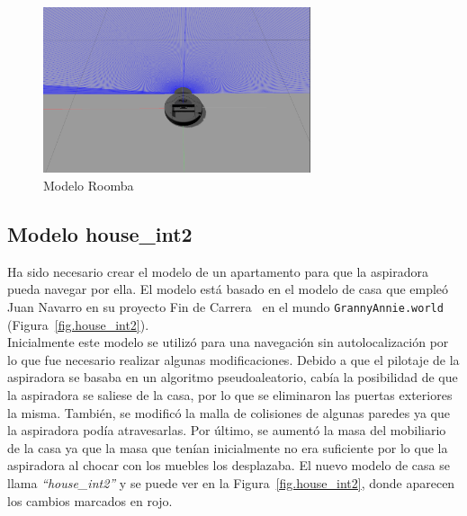 \begin{figure}[H]
  \begin{center}
    \includegraphics[width=0.7\textwidth]{figures/Vacuum/vacuumModel.png}
		\caption{Modelo Roomba}
		\label{fig.vacuumModel}
		\end{center}
\end{figure}


\subsection{Modelo house\_int2}
Ha sido necesario crear el modelo de un apartamento para que la aspiradora pueda navegar por ella. El modelo está basado en el modelo de casa que empleó Juan Navarro en su proyecto Fin de Carrera~\cite{localization1} en el mundo \texttt{GrannyAnnie.world} (Figura~\ref{fig.house_int2}).\\

Inicialmente este modelo se utilizó para una navegación sin autolocalización por lo que fue necesario realizar algunas modificaciones. Debido a que el pilotaje de la aspiradora se basaba en un algoritmo pseudoaleatorio, cabía la posibilidad de que la aspiradora se saliese de la casa, por lo que se eliminaron las puertas exteriores la misma. También, se modificó la malla de colisiones de algunas paredes ya que la aspiradora podía atravesarlas. Por último, se aumentó la masa del mobiliario de la casa ya que la masa que tenían inicialmente no era suficiente por lo que la aspiradora al chocar con los muebles los desplazaba. El nuevo modelo de casa se llama \textit{``house\_int2''} y se puede ver en la Figura~\ref{fig.house_int2}, donde aparecen los cambios marcados en rojo.\\


